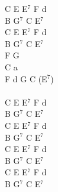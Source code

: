 \documentclass[a5paper, 10pt]{book}
\begin{document}
\begin{minipage}[t]{0.25\textwidth}
C E E$^7$ F d\\
B G$^7$ C E$^7$\\
C E E$^7$ F d\\
B G$^7$ C E$^7$\\

F G\\
C a\\
F d G C (E$^7$)\\
\\
C E E$^7$ F d\\
B G$^7$ C E$^7$\\
C E E$^7$ F d\\
B G$^7$ C E$^7$\\

C E E$^7$ F d\\
B G$^7$ C E$^7$\\
C E E$^7$ F d\\
B G$^7$ C E$^7$\\

\end{minipage}
\vfill
\end{document}
